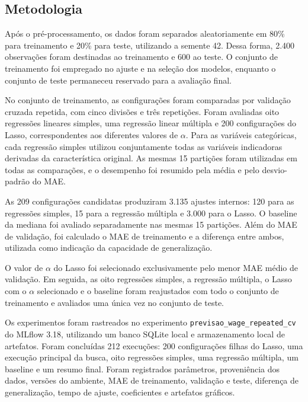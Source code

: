 
\subsection{Metodologia}

Após o pré-processamento, os dados foram separados aleatoriamente em 80\% para treinamento e 20\% para teste, utilizando a semente 42. Dessa forma, 2.400 observações foram destinadas ao treinamento e 600 ao teste. O conjunto de treinamento foi empregado no ajuste e na seleção dos modelos, enquanto o conjunto de teste permaneceu reservado para a avaliação final.

No conjunto de treinamento, as configurações foram comparadas por validação cruzada repetida, com cinco divisões e três repetições. Foram avaliadas oito regressões lineares simples, uma regressão linear múltipla e 200 configurações do Lasso, correspondentes aos diferentes valores de $\alpha$. Para as variáveis categóricas, cada regressão simples utilizou conjuntamente todas as variáveis indicadoras derivadas da característica original. As mesmas 15 partições foram utilizadas em todas as comparações, e o desempenho foi resumido pela média e pelo desvio-padrão do MAE.

As 209 configurações candidatas produziram 3.135 ajustes internos: 120 para as regressões simples, 15 para a regressão múltipla e 3.000 para o Lasso. O baseline da mediana foi avaliado separadamente nas mesmas 15 partições. Além do MAE de validação, foi calculado o MAE de treinamento e a diferença entre ambos, utilizada como indicação da capacidade de generalização.

O valor de $\alpha$ do Lasso foi selecionado exclusivamente pelo menor MAE médio de validação. Em seguida, as oito regressões simples, a regressão múltipla, o Lasso com o $\alpha$ selecionado e o baseline foram reajustados com todo o conjunto de treinamento e avaliados uma única vez no conjunto de teste.

Os experimentos foram rastreados no experimento \texttt{previsao\_wage\_repeated\_cv} do MLflow 3.18, utilizando um banco SQLite local e armazenamento local de artefatos. Foram concluídas 212 execuções: 200 configurações filhas do Lasso, uma execução principal da busca, oito regressões simples, uma regressão múltipla, um baseline e um resumo final. Foram registrados parâmetros, proveniência dos dados, versões do ambiente, MAE de treinamento, validação e teste, diferença de generalização, tempo de ajuste, coeficientes e artefatos gráficos.

\clearpage
